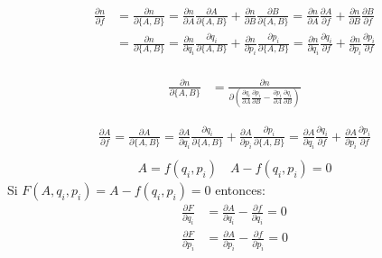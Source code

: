 \documentclass[a4paper]{article}
\begin{document}
\begin{answer}[punto 21]
        \begin{align*}
            \frac{\partial n}{\partial f} &= \frac{\partial n}{\partial \{A,B\}}= \frac{\partial n}{\partial A} \frac{\partial A}{\partial \{A,B\}} + \frac{\partial n}{\partial B} \frac{\partial B}{\partial \{A,B\}} = \frac{\partial n}{\partial A} \frac{\partial A}{\partial f} + \frac{\partial n}{\partial B} \frac{\partial B}{\partial f}\\
            &= \frac{\partial n}{\partial \{A,B\}} = \frac{\partial n}{\partial q_i} \frac{\partial q_i}{\partial \{A,B\}} + \frac{\partial n}{\partial p_i} \frac{\partial p_i}{\partial \{A,B\}} = \frac{\partial n}{\partial q_i} \frac{\partial q_i}{\partial f} + \frac{\partial n}{\partial p_i} \frac{\partial p_i}{\partial f}\\
        \end{align*}
        
        \begin{align*}
            \frac{\partial n}{\partial \{A,B\}} &= \frac{\partial n}{\partial \left(\frac{\partial q_i}{\partial A} \frac{\partial p_i}{\partial B} - \frac{\partial p_i}{\partial A} \frac{\partial q_i}{\partial B}\right)}
        \end{align*}

        \begin{align*}
            \frac{\partial A}{\partial f} = \frac{\partial A}{\partial \{A,B\}} = \frac{\partial A}{\partial q_i} \frac{\partial q_i}{\partial \{A,B\}} + \frac{\partial A}{\partial p_i} \frac{\partial p_i}{\partial \{A,B\}} = \frac{\partial A}{\partial q_i} \frac{\partial q_i}{\partial f} + \frac{\partial A}{\partial p_i} \frac{\partial p_i}{\partial f}\\
        \end{align*}
        \begin{align*}
            A = f(q_i, p_i) \quad A - f(q_i, p_i) =0  
        \end{align*}
        Si $F(A,q_i,p_i) = A - f(q_i, p_i)= 0$ entonces:
        \begin{align*}
            \frac{\partial F}{\partial q_i} &= \frac{\partial A}{\partial q_i} - \frac{\partial f}{\partial q_i} = 0\\
            \frac{\partial F}{\partial p_i} &= \frac{\partial A}{\partial p_i} - \frac{\partial f}{\partial p_i} = 0\\
        \end{align*}


\end{answer}
\end{document}
